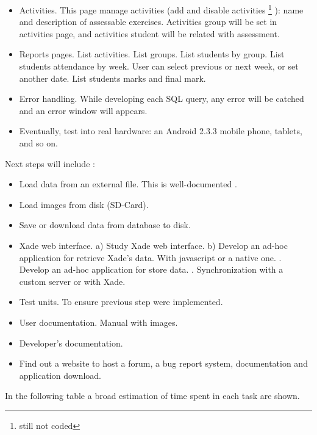 \begin{itemize}
  \item  Activities. This page manage activities (add and disable activities \footnote{still not coded} ): name and description of assessable exercises. 
  \subitem  Activities group will be set in activities page, and activities student will be related with assessment.
  \item Reports pages.
  \subitem  List activities.
  \subitem  List groups.
  \subitem  List students by group.
  \subitem  List students attendance by week. User can select previous or next week, or set another date.
  \subitem  List students marks and final mark.
  
  \item Error handling. While developing each SQL query, any error will be catched and an error window will appears. 
  \item Eventually, test into real hardware: an Android 2.3.3 mobile phone, tablets, and so on.
  \end{itemize}
  
	   Next steps will include :  
  \begin{itemize}
  \item   Load data from an external file. This is well-documented \cite{}.  
  \item   Load images from disk (SD-Card).
  \item  Save or download data from database to disk.
  \item  Xade web interface.
  \subitem    a) Study Xade web interface.
  \subitem    b) Develop an ad-hoc application for retrieve Xade's data. With javascript or a native one. 
  . Develop an ad-hoc application for store data. 
  . Synchronization with a custom server or with Xade.
  \item   Test units. To ensure previous step were implemented.
  \item   User documentation. Manual with images.
  \item   Developer's documentation.
  \item   Find out a website to host a forum, a bug report system,  documentation and application download.
	\end{itemize}
	
In the following table a broad estimation of time spent in each task are shown.  


